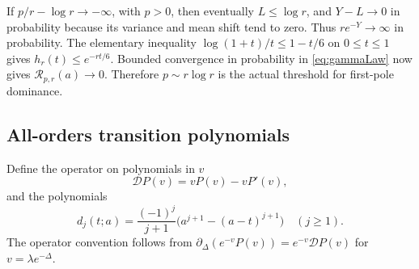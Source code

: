 \documentclass[11pt]{article}
\numberwithin{equation}{section}
\theoremstyle{definition}\newtheorem{definition}[theorem]{Definition}
\theoremstyle{remark}\newtheorem{remark}[theorem]{Remark}
\newcommand{\calD}{\mathcal D}
\begin{document}
If $p/r-\log r\to-\infty$, with $p>0$, then eventually $L\le\log r$, and $Y-L\to0$ in probability because its variance and mean shift tend to zero. Thus $re^{-Y}\to\infty$ in probability. The elementary inequality
$\log(1+t)/t\le1-t/6$ on $0\le t\le1$ gives
$h_r(t)\le e^{-rt/6}$. Bounded convergence in probability in \eqref{eq:gammaLaw} now gives $\mathcal R_{p,r}(a)\to0$. Therefore $p\sim r\log r$ is the actual threshold for first-pole dominance.

\subsection{All-orders transition polynomials}
\label{sec:allorders}
Define the operator on polynomials in $v$
\begin{equation}\label{eq:Dop}
 \calD P(v)=vP(v)-vP'(v),
\end{equation}
and the polynomials
\begin{equation}\label{eq:dj}
 d_j(t;a)=\frac{(-1)^j}{j+1}
              \bigl(a^{j+1}-(a-t)^{j+1}\bigr)\quad(j\ge1).
\end{equation}
The operator convention follows from
$\partial_\Delta(e^{-v}P(v))=e^{-v}\calD P(v)$ for $v=\lambda e^{-\Delta}$.
\end{document}
